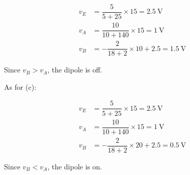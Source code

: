 \documentclass{article}
\begin{document}
\begin{equation*}
  \begin{aligned}
    v_E &= \dfrac{5}{5 + 25} \times 15 = 2.5 \  \mathrm{V} \\
    v_A &= \dfrac{10}{10 + 140} \times 15 = 1 \  \mathrm{V} \\
    v_B &= - \dfrac{2}{18 + 2} \times 10 + 2.5 = 1.5 \  \mathrm{V} 
  \end{aligned}
\end{equation*}

Since $v_B > v_A$, the dipole is off.

As for (c):

\begin{equation*}
  \begin{aligned}
    v_E &= \dfrac{5}{5 + 25} \times 15 = 2.5 \  \mathrm{V} \\
    v_A &= \dfrac{10}{10 + 140} \times 15 = 1 \  \mathrm{V} \\
    v_B &= - \dfrac{2}{18 + 2} \times 20 + 2.5 = 0.5 \  \mathrm{V} 
  \end{aligned}
\end{equation*}

Since $v_B < v_A$, the dipole is on.
\end{document}
